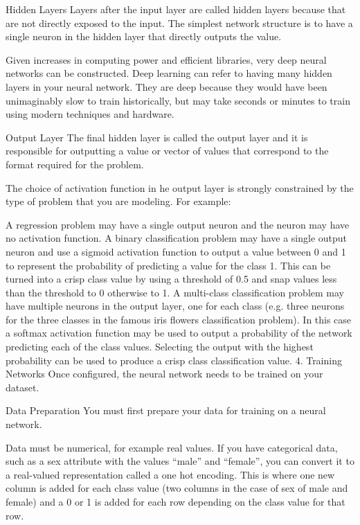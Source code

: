 \documentclass[12pt]{article}
\begin{document}
Hidden Layers
Layers after the input layer are called hidden layers because that are not directly exposed to the input. The simplest network structure is to have a single neuron in the hidden layer that directly outputs the value.

Given increases in computing power and efficient libraries, very deep neural networks can be constructed. Deep learning can refer to having many hidden layers in your neural network. They are deep because they would have been unimaginably slow to train historically, but may take seconds or minutes to train using modern techniques and hardware.

Output Layer
The final hidden layer is called the output layer and it is responsible for outputting a value or vector of values that correspond to the format required for the problem.

The choice of activation function in he output layer is strongly constrained by the type of problem that you are modeling. For example:

A regression problem may have a single output neuron and the neuron may have no activation function.
A binary classification problem may have a single output neuron and use a sigmoid activation function to output a value between 0 and 1 to represent the probability of predicting a value for the class 1. This can be turned into a crisp class value by using a threshold of 0.5 and snap values less than the threshold to 0 otherwise to 1.
A multi-class classification problem may have multiple neurons in the output layer, one for each class (e.g. three neurons for the three classes in the famous iris flowers classification problem). In this case a softmax activation function may be used to output a probability of the network predicting each of the class values. Selecting the output with the highest probability can be used to produce a crisp class classification value.
4. Training Networks
Once configured, the neural network needs to be trained on your dataset.

Data Preparation
You must first prepare your data for training on a neural network.

Data must be numerical, for example real values. If you have categorical data, such as a sex attribute with the values “male” and “female”, you can convert it to a real-valued representation called a one hot encoding. This is where one new column is added for each class value (two columns in the case of sex of male and female) and a 0 or 1 is added for each row depending on the class value for that row.
\end{document}
